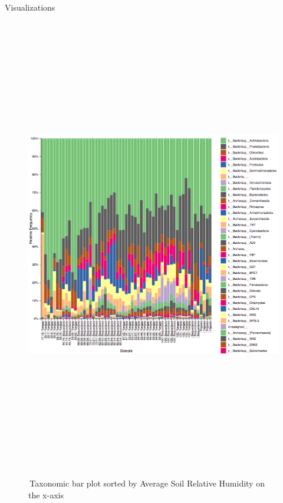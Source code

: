\documentclass[final]{beamer}
\newlength{\colwidth}
\begin{document}
\begin{frame}[t]
\begin{columns}[t]
\begin{column}{\colwidth}
\begin{block}{Visualizations}
    \begin{figure}[tph!]
      {\includegraphics[height=20cm]{assets/taxabar-plot}}
      \caption{\,Taxonomic bar plot sorted by Average Soil Relative Humidity on the x-axis }
      \label{fig:taxabar-plot}
    \end{figure}


\end{block}
\end{column}
\end{columns}
\end{frame}
\end{document}

